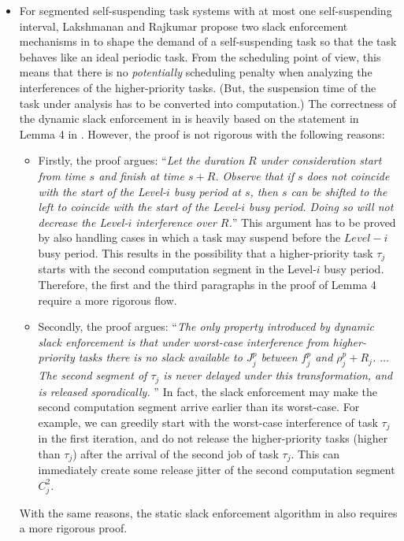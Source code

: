 \begin{itemize}
\item For segmented self-suspending task systems with at most one
  self-suspending interval, Lakshmanan and Rajkumar propose two slack
  enforcement mechanisms in \cite{LR:rtas10} to shape the demand of a
  self-suspending task so that the task behaves like an ideal periodic
  task.  From the scheduling point of view, this means that there is
  no \emph{potentially} scheduling penalty when analyzing the interferences of the
  higher-priority tasks. (But, the suspension time of the task under
  analysis has to be converted into computation.) The correctness of the dynamic slack
  enforcement in \cite{LR:rtas10} is heavily based on the statement in Lemma
  4 in \cite{LR:rtas10}. However, the proof is not rigorous with the
  following reasons:
  \begin{itemize}
  \item Firstly, the proof argues: ``\emph{Let the duration $R$ under
    consideration start from time $s$ and finish at time $s +
    R$. Observe that if $s$ does not coincide with the start of the
    Level-$i$ busy period at $s$, then $s$ can be shifted to the left
    to coincide with the start of the Level-$i$ busy period. Doing so
    will not decrease the Level-$i$ interference over $R$.}'' This
    argument has to be proved by also handling cases in which a task
    may suspend before the $Level-i$ busy period. This results in the
    possibility that a higher-priority task $\tau_j$ starts with the
    second computation segment in the Level-$i$ busy
    period. Therefore, the first and the third paragraphs in the proof
    of Lemma 4 \cite{LR:rtas10} require a more rigorous flow.

  \item Secondly, the proof argues: ``\emph{The only property
      introduced by dynamic slack enforcement is that under worst-case
      interference from higher-priority tasks there is no slack
      available to $J_j^p$ between $f_j^p$ and $\rho_j^p + R_j$.
      $\ldots$ The second segment of $\tau_j$ is never delayed under
      this transformation, and is released sporadically.} '' In fact,
    the slack enforcement may make the second computation segment
    arrive earlier than its worst-case. For example, we can greedily
    start with the worst-case interference of task $\tau_j$ in the
    first iteration, and do not release the higher-priority tasks
    (higher than $\tau_j$) after the arrival of the second job of task
    $\tau_j$. This can immediately create some release jitter of the
    second computation segment $C_j^2$.
  \end{itemize}
  With the same reasons, the static slack enforcement algorithm in
  \cite{LR:rtas10} also requires a more rigorous proof.
\end{itemize}

